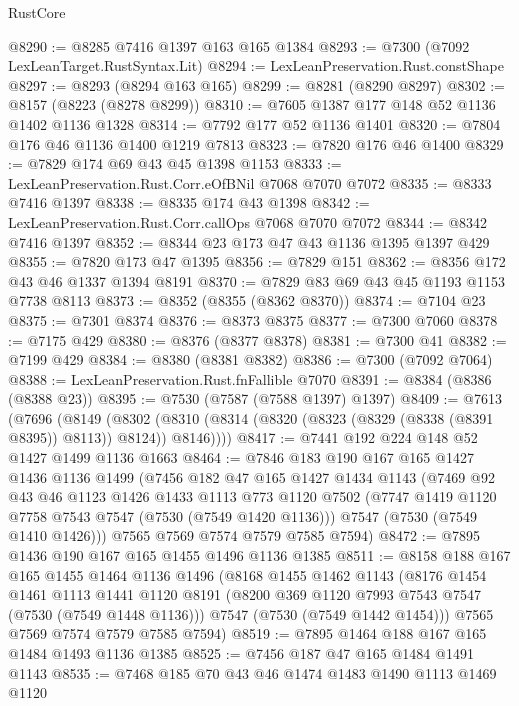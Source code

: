 \begin{lexlean}{RustCore}
\begin{coremodule}
@8290 := @8285 @7416 @1397 @163 @165 @1384
@8293 := @7300 (@7092 LexLeanTarget.RustSyntax.Lit)
@8294 := LexLeanPreservation.Rust.constShape
@8297 := @8293 (@8294 @163 @165)
@8299 := @8281 (@8290 @8297)
@8302 := @8157 (@8223 (@8278 @8299))
@8310 := @7605 @1387 @177 @148 @52 @1136 @1402 @1136 @1328
@8314 := @7792 @177 @52 @1136 @1401
@8320 := @7804 @176 @46 @1136 @1400 @1219 @7813
@8323 := @7820 @176 @46 @1400
@8329 := @7829 @174 @69 @43 @45 @1398 @1153
@8333 := LexLeanPreservation.Rust.Corr.eOfBNil @7068 @7070 @7072
@8335 := @8333 @7416 @1397
@8338 := @8335 @174 @43 @1398
@8342 := LexLeanPreservation.Rust.Corr.callOps @7068 @7070 @7072
@8344 := @8342 @7416 @1397
@8352 := @8344 @23 @173 @47 @43 @1136 @1395 @1397 @429
@8355 := @7820 @173 @47 @1395
@8356 := @7829 @151
@8362 := @8356 @172 @43 @46 @1337 @1394 @8191
@8370 := @7829 @83 @69 @43 @45 @1193 @1153 @7738 @8113
@8373 := @8352 (@8355 (@8362 @8370))
@8374 := @7104 @23
@8375 := @7301 @8374
@8376 := @8373 @8375
@8377 := @7300 @7060
@8378 := @7175 @429
@8380 := @8376 (@8377 @8378)
@8381 := @7300 @41
@8382 := @7199 @429
@8384 := @8380 (@8381 @8382)
@8386 := @7300 (@7092 @7064)
@8388 := LexLeanPreservation.Rust.fnFallible @7070
@8391 := @8384 (@8386 (@8388 @23))
@8395 := @7530 (@7587 (@7588 @1397) @1397)
@8409 := @7613
    (@7696
      (@8149
        (@8302 (@8310 (@8314 (@8320 (@8323 (@8329 (@8338 (@8391 @8395)) @8113)) @8124)) @8146))))
@8417 := @7441 @192 @224 @148 @52 @1427 @1499 @1136 @1663
@8464 := @7846
    @183
    @190
    @167
    @165
    @1427
    @1436
    @1136
    @1499
    (@7456
      @182
      @47
      @165
      @1427
      @1434
      @1143
      (@7469
        @92
        @43
        @46
        @1123
        @1426
        @1433
        @1113
        @773
        @1120
        @7502
        (@7747 @1419 @1120 @7758 @7543 @7547 (@7530 (@7549 @1420 @1136)))
        @7547
        (@7530 (@7549 @1410 @1426)))
      @7565
      @7569
      @7574
      @7579
      @7585
      @7594)
@8472 := @7895 @1436 @190 @167 @165 @1455 @1496 @1136 @1385
@8511 := @8158
    @188
    @167
    @165
    @1455
    @1464
    @1136
    @1496
    (@8168
      @1455
      @1462
      @1143
      (@8176
        @1454
        @1461
        @1113
        @1441
        @1120
        @8191
        (@8200 @369 @1120 @7993 @7543 @7547 (@7530 (@7549 @1448 @1136)))
        @7547
        (@7530 (@7549 @1442 @1454)))
      @7565
      @7569
      @7574
      @7579
      @7585
      @7594)
@8519 := @7895 @1464 @188 @167 @165 @1484 @1493 @1136 @1385
@8525 := @7456 @187 @47 @165 @1484 @1491 @1143
@8535 := @7468 @185 @70 @43 @46 @1474 @1483 @1490 @1113 @1469 @1120

\end{coremodule}
\end{lexlean}
